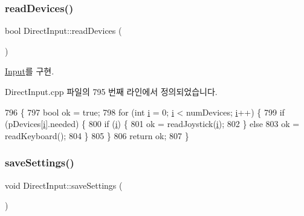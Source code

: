 \mbox{\label{class_direct_input_a53a2984e75989b381fdae4c8c33f5c32}} 
\subsubsection{\texorpdfstring{read\+Devices()}{readDevices()}}
{\footnotesize\ttfamily bool Direct\+Input\+::read\+Devices (\begin{DoxyParamCaption}{ }\end{DoxyParamCaption})\hspace{0.3cm}{\ttfamily [virtual]}}



\mbox{\hyperlink{class_input_a422dbf7bc783378d47eddec93d1f565a}{Input}}를 구현.



Direct\+Input.\+cpp 파일의 795 번째 라인에서 정의되었습니다.


\begin{DoxyCode}
796 \{
797     \textcolor{keywordtype}{bool} ok = \textcolor{keyword}{true};
798     \textcolor{keywordflow}{for} (\textcolor{keywordtype}{int} \mbox{\hyperlink{expr-lex_8cpp_acb559820d9ca11295b4500f179ef6392}{i}} = 0; \mbox{\hyperlink{expr-lex_8cpp_acb559820d9ca11295b4500f179ef6392}{i}} < numDevices; \mbox{\hyperlink{expr-lex_8cpp_acb559820d9ca11295b4500f179ef6392}{i}}++) \{
799         \textcolor{keywordflow}{if} (pDevices[\mbox{\hyperlink{expr-lex_8cpp_acb559820d9ca11295b4500f179ef6392}{i}}].needed) \{
800             \textcolor{keywordflow}{if} (\mbox{\hyperlink{expr-lex_8cpp_acb559820d9ca11295b4500f179ef6392}{i}}) \{
801                 ok = readJoystick(\mbox{\hyperlink{expr-lex_8cpp_acb559820d9ca11295b4500f179ef6392}{i}});
802             \} \textcolor{keywordflow}{else}
803                 ok = readKeyboard();
804         \}
805     \}
806     \textcolor{keywordflow}{return} ok;
807 \}
\end{DoxyCode}
\mbox{\label{class_direct_input_aaf3473a97962c8dad1ef6715b5164c9d}} 
\subsubsection{\texorpdfstring{save\+Settings()}{saveSettings()}}
{\footnotesize\ttfamily void Direct\+Input\+::save\+Settings (\begin{DoxyParamCaption}{ }\end{DoxyParamCaption})\hspace{0.3cm}{\ttfamily [virtual]}}



